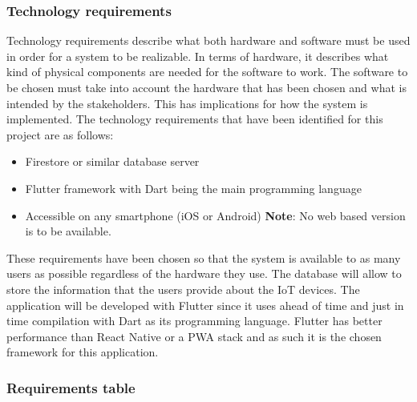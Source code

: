 \subsubsection*{Technology requirements}

Technology requirements describe what both hardware and software must be
used in order for a system to be realizable. In terms of hardware, it describes
what kind of physical components are needed for the software to work. The
software to be chosen must take into account the hardware that has been
chosen and what is intended by the stakeholders. This has implications for
how the system is implemented.
\newline
The technology requirements that have been identified for this project are as follows:
\begin{itemize}
    \item Firestore or similar database server
    \item Flutter framework with Dart being the main programming language
    \item Accessible on any smartphone (iOS or Android) \newline \textbf{Note}: No web based version is to be available.
\end{itemize}
These requirements have been chosen so that the system is available to as
many users as possible regardless of the hardware they use. The database
will allow to store the information that the users provide about the IoT
devices. The application will be developed with Flutter since it uses ahead
of time and just in time compilation with Dart as its programming language.
Flutter has better performance than React Native or a PWA stack and as such it is the chosen framework for
this application.

\subsubsection*{Requirements table}

